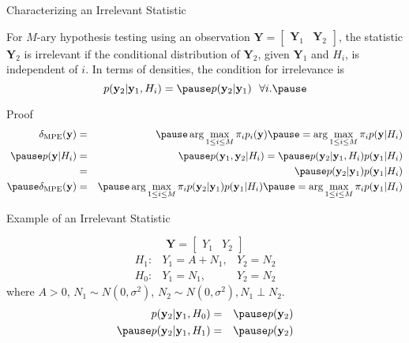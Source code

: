 \documentclass[t]{beamer}
\begin{document}
\begin{frame}{Characterizing an Irrelevant Statistic}
  \footnotesize
  \begin{theorem}
    For $M$-ary hypothesis testing using an observation $\mathbf{Y} = \begin{bmatrix} \mathbf{Y}_1 & \mathbf{Y}_2\end{bmatrix}$, \pause the statistic $\mathbf{Y}_2$ is irrelevant if the conditional distribution of $\mathbf{Y}_2$, \pause given $\mathbf{Y}_1$ and $H_i$, \pause is independent of $i$. \pause In terms of densities, the condition for irrelevance is
    \begin{equation*}
      p(\mathbf{y}_2|\mathbf{y}_1,H_i) = \pause p(\mathbf{y}_2|\mathbf{y}_1) \ \ \forall i.
    \pause
    \end{equation*}
  \end{theorem}
  {Proof}
    \begin{eqnarray*}
      \delta_{\text{MPE}}(\mathbf{y}) & = & \pause \arg\max_{1\leq i \leq M} \pi_i p_i(\mathbf{y}) \pause = \arg\max_{1\leq i \leq M} \pi_i p(\mathbf{y}|H_i) \\
      \pause p(\mathbf{y}|H_i) & = & \pause p(\mathbf{y}_1,\mathbf{y}_2|H_i) = \pause p(\mathbf{y}_2|\mathbf{y}_1,H_i)p(\mathbf{y}_1|H_i) \\
                        & = & \pause p(\mathbf{y}_2|\mathbf{y}_1)p(\mathbf{y}_1|H_i) \\ \pause
      \delta_{\text{MPE}}(\mathbf{y}) & = & \pause \arg\max_{1\leq i \leq M} \pi_i p(\mathbf{y}_2|\mathbf{y}_1) p(\mathbf{y}_1|H_i) \pause = \arg\max_{1\leq i \leq M} \pi_i p(\mathbf{y}_1|H_i)
    \end{eqnarray*}
  \normalsize
\end{frame}

\begin{frame}{Example of an Irrelevant Statistic}
  \footnotesize
  \begin{example}
    \begin{equation*}
      \mathbf{Y} = \begin{bmatrix} Y_1 & Y_2 \end{bmatrix}
    \end{equation*}
    \pause
    \begin{equation*}
      \begin{array}{lll}
        H_1 : & Y_1 = A+N_1,& Y_2 = N_2 \\
        H_0 : & Y_1 = N_1,& Y_2 = N_2 
      \end{array}
    \end{equation*}
    where $A >0$, $N_1 \sim N(0,\sigma^2)$, $N_2 \sim N(0,\sigma^2), N_1 \perp N_2$.
    \pause
    \begin{eqnarray*}
      p(\mathbf{y}_2|\mathbf{y}_1,H_0) & = & \pause p(\mathbf{y}_2) \\
      \pause
      p(\mathbf{y}_2|\mathbf{y}_1,H_1) & = & \pause p(\mathbf{y}_2) 
    \end{eqnarray*}
  \end{example}
  \normalsize
\end{frame}
\end{document}

